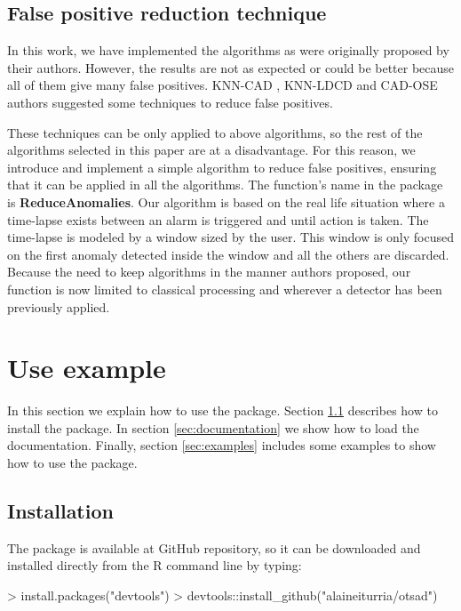 \documentclass[a4paper]{article}
\begin{document}
\subsection{False positive reduction technique} \label{sec:fp}

In this work, we have implemented the algorithms as were originally proposed by their authors. However, the results are not as expected or could be better because all of them give many false positives. KNN-CAD \cite{2016arXiv160804585B}, KNN-LDCD \cite{2017arXiv170603412I} and CAD-OSE \cite{2018-Smirnov-ContextualAnomalyDetector} authors suggested some techniques to reduce false positives.

These techniques can be only applied to above algorithms, so the rest of the algorithms selected in this paper are at a disadvantage. For this reason, we introduce and implement a simple algorithm to reduce false positives, ensuring that it can be applied in all the algorithms. The function's name in the package is \textbf{ReduceAnomalies}. Our algorithm is based on the real life situation where a time-lapse exists between an alarm is triggered and until action is taken. The time-lapse is modeled by a window sized by the user. This window is only focused on the first anomaly detected inside the window and all the others are discarded. Because the need to keep algorithms in the manner authors proposed, our function is now limited to classical processing and wherever a detector has been previously applied.

\section{Use example}\label{sec:examplesec}

In this section we explain how to use the package. Section \ref{sec:installation} describes  how to install the package. In section \ref{sec:documentation} we show how to load the documentation. Finally, section \ref{sec:examples} includes some examples to show how to use the package.

\subsection{Installation}\label{sec:installation}

The  package is available at GitHub repository, so it can be downloaded and installed directly from the R command line by typing:

\begin{Schunk}
\begin{Sinput}
> install.packages("devtools")
> devtools::install_github("alaineiturria/otsad")
\end{Sinput}
\end{Schunk}
\end{document}
